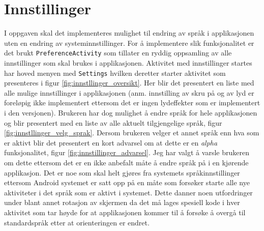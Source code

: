 \section{Innstillinger}
I oppgaven skal det implementeres mulighet til endring av språk i applikasjonen uten en endring av systeminnstillinger. For å implementere slik funksjonalitet er det brukt \texttt{PreferenceActivity} som tillater en ryddig oppsamling av alle innstillinger som skal brukes i applikasjonen. Aktivitet med innstillinger startes har hoved menyen med \texttt{Settings} hvilken deretter starter aktivitet som presenteres i figur \ref{fig:innstllinger_oversikt}. Her blir det presentert en liste med alle mulige innstillinger i applikasjonen (anm. innstilling av skru på og av lyd er foreløpig ikke implementert ettersom det er ingen lydeffekter som er implementert i den versjonen). Brukeren har dog mulighet å endre språk for hele applikasjonen og blir presentert med en liste av alle aktuelt tilgjengelige språk, figur \ref{fig:innstllinger_velg_sprak}. Dersom brukeren velger et annet språk enn hva som er aktivt blir det presentert en kort advarsel om at dette er en \textit{alpha} funksjonalitet, figur \ref{fig:innstillinger_advarsel}. Jeg har valgt å varsle brukeren om dette ettersom det er en ikke anbefalt måte å endre språk på i en kjørende applikasjon. Det er noe som skal helt gjøres fra systemets språkinnstillinger ettersom Android systemet er satt opp på en måte som forsøker starte alle nye aktiviteter i det språk som er aktivt i systemet. Dette danner noen utfordringer under blant annet rotasjon av skjermen da det må lages spesiell kode i hver aktivitet som tar høyde for at applikasjonen kommer til å forsøke å overgå til standardspråk etter at orienteringen er endret.


